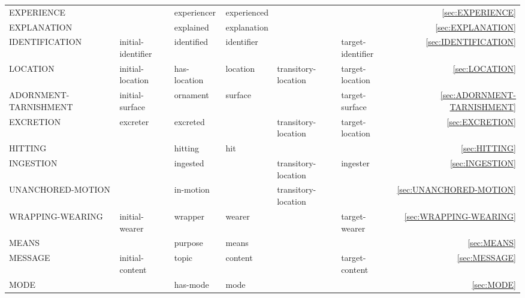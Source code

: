 \documentclass[a4paper]{article}
\newcommand{\fr}[1]{\textsf{#1}}
\newcommand{\rl}[1]{\textsf{#1}}
\newcommand{\Sub}{\textnoto{└} }
\newcommand{\SubSub}{\textcolor{white}{\Sub}\Sub}
\begin{document}
\begin{table}
{\begin{NiceTabular}{llllllr}
            \Sub{} \fr{EXPERIENCE} & & \rl{experiencer} & \rl{experienced} &  &  & \ref{sec:EXPERIENCE} \\

            \Sub{} \fr{EXPLANATION} & & \rl{explained} & \rl{explanation} & & & \ref{sec:EXPLANATION} \\

            \Sub{} \fr{IDENTIFICATION} & \rl{initial-identifier} & \rl{identified} & \rl{identifier} & & \rl{target-identifier} & \ref{sec:IDENTIFICATION} \\

            \Sub{} \fr{LOCATION} & \rl{initial-location} & \rl{has-location} & \rl{location} & \rl{transitory-location} & \rl{target-location} & \ref{sec:LOCATION} \\
            \SubSub{} \fr{ADORNMENT-TARNISHMENT} & \rl{initial-surface} & \rl{ornament} & \rl{surface} & & \rl{target-surface} & \ref{sec:ADORNMENT-TARNISHMENT} \\
            \SubSub{} \fr{EXCRETION} & \rl{excreter} & \rl{excreted} & & \rl{transitory-location} & \rl{target-location} & \ref{sec:EXCRETION} \\
            \SubSub{} \fr{HITTING} & & \rl{hitting} & \rl{hit} & & & \ref{sec:HITTING} \\
            \SubSub{} \fr{INGESTION} & & \rl{ingested} & & \rl{transitory-location} & \rl{ingester} & \ref{sec:INGESTION} \\
            \SubSub{} \fr{UNANCHORED-MOTION} & & \rl{in-motion} & & \rl{transitory-location} & & \ref{sec:UNANCHORED-MOTION} \\
            \SubSub{} \fr{WRAPPING-WEARING} & \rl{initial-wearer} & \rl{wrapper} & \rl{wearer} & & \rl{target-wearer} & \ref{sec:WRAPPING-WEARING} \\

            \Sub{} \fr{MEANS} & & \rl{purpose} & \rl{means} & & & \ref{sec:MEANS} \\

            \Sub{} \fr{MESSAGE} & \rl{initial-content} & \rl{topic} & \rl{content} & & \rl{target-content} & \ref{sec:MESSAGE} \\

            \Sub{} \fr{MODE} & & \rl{has-mode} & \rl{mode} & & & \ref{sec:MODE} \\


\end{NiceTabular}}
\end{table}
\end{document}
